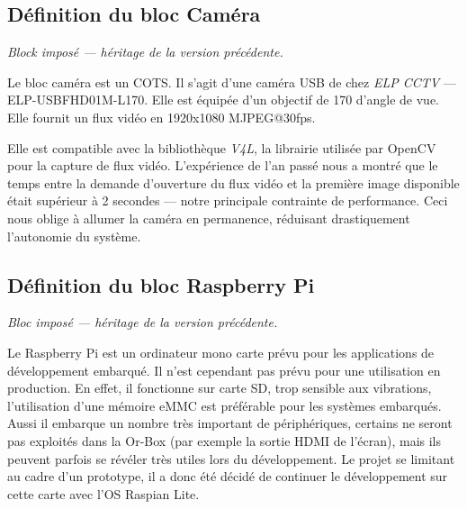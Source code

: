 \subsection{Définition du bloc Caméra}
\label{sub:DefCam}
\emph{Block imposé --- héritage de la version précédente.}

Le bloc caméra est un COTS.
Il s'agit d'une caméra USB de chez \emph{ELP CCTV} --- ELP-USBFHD01M-L170.
Elle est équipée d'un objectif de 170 \degree d'angle de vue.
Elle fournit un flux vidéo en 1920x1080 MJPEG@30fps.


Elle est compatible avec la bibliothèque \emph{V4L}, la librairie utilisée par OpenCV pour la capture de flux vidéo.
L'expérience de l'an passé nous a montré que le temps entre la demande d'ouverture du flux vidéo et la première image disponible était supérieur à 2 secondes --- notre principale contrainte de performance.
Ceci nous oblige à allumer la caméra en permanence, réduisant drastiquement l'autonomie du système.

\subsection{Définition du bloc Raspberry Pi}
\label{sub:DefRPi}
\emph{Bloc imposé --- héritage de la version précédente.}

Le Raspberry Pi est un ordinateur mono carte prévu pour les applications de développement embarqué.
Il n'est cependant pas prévu pour une utilisation en production.
En effet, il fonctionne sur carte SD, trop sensible aux vibrations, l'utilisation d'une mémoire eMMC est préférable pour les systèmes embarqués.
Aussi il embarque un nombre très important de périphériques, certains ne seront pas exploités dans la Or-Box (par exemple la sortie HDMI de l'écran), mais ils peuvent parfois se révéler très utiles lors du développement.
Le projet se limitant au cadre d'un prototype, il a donc été décidé de continuer le développement sur cette carte avec l'OS Raspian Lite. 


